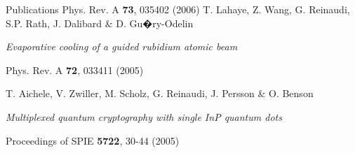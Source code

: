 \begin{rubric}{Publications}
{{Phys. Rev. A \textbf{73}, 035402 (2006)
}}
%
%
\entry*[2005]%
T. Lahaye, Z. Wang, G. Reinaudi, S.P. Rath, J. Dalibard \& D. Gu�ry-Odelin
\par{
\emph{Evaporative cooling of a guided rubidium atomic beam}
\par{
Phys. Rev. A \textbf{72}, 033411 (2005)
}}
%
%
\entry*[2005]%
T. Aichele, V. Zwiller, M. Scholz, G. Reinaudi, J. Persson \& O. Benson
\par{
\emph{Multiplexed quantum cryptography with single InP quantum dots}
\par{
Proceedings of SPIE \textbf{5722}, 30-44 (2005)
}}
%
%
%

\end{rubric}
